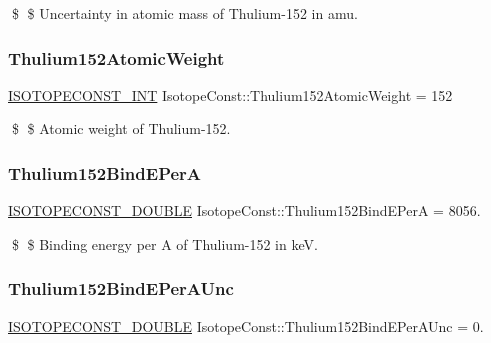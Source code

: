 \$ \$ Uncertainty in atomic mass of Thulium-\/152 in amu. \mbox{\label{group___isotope_const-_thulium-_tm152_ga4d8d8825f0a9bdd8d08ed8bf4fdaf767}} 
\subsubsection{\texorpdfstring{Thulium152\+Atomic\+Weight}{Thulium152AtomicWeight}}
{\footnotesize\ttfamily \mbox{\hyperlink{group___isotope_const-_macros_ga5f18360b3e99483a35c32d789e62621c}{I\+S\+O\+T\+O\+P\+E\+C\+O\+N\+S\+T\+\_\+\+I\+NT}} Isotope\+Const\+::\+Thulium152\+Atomic\+Weight = 152}

\$ \$ Atomic weight of Thulium-\/152. \mbox{\label{group___isotope_const-_thulium-_tm152_ga3ae7eafe123dcea57d485f2597ad0469}} 
\subsubsection{\texorpdfstring{Thulium152\+Bind\+E\+PerA}{Thulium152BindEPerA}}
{\footnotesize\ttfamily \mbox{\hyperlink{group___isotope_const-_macros_ga8f45a7272ce02c0b4c65c44636ed719a}{I\+S\+O\+T\+O\+P\+E\+C\+O\+N\+S\+T\+\_\+\+D\+O\+U\+B\+LE}} Isotope\+Const\+::\+Thulium152\+Bind\+E\+PerA = 8056.}

\$ \$ Binding energy per A of Thulium-\/152 in keV. \mbox{\label{group___isotope_const-_thulium-_tm152_gaec2bfb2602019fdb830eda445cb999ce}} 
\subsubsection{\texorpdfstring{Thulium152\+Bind\+E\+Per\+A\+Unc}{Thulium152BindEPerAUnc}}
{\footnotesize\ttfamily \mbox{\hyperlink{group___isotope_const-_macros_ga8f45a7272ce02c0b4c65c44636ed719a}{I\+S\+O\+T\+O\+P\+E\+C\+O\+N\+S\+T\+\_\+\+D\+O\+U\+B\+LE}} Isotope\+Const\+::\+Thulium152\+Bind\+E\+Per\+A\+Unc = 0.}

